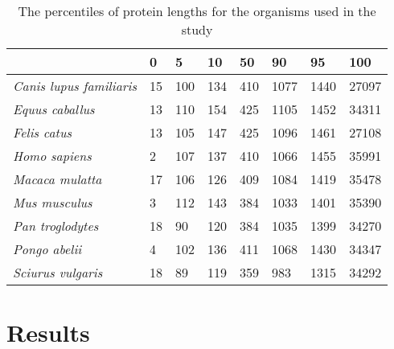 \documentclass[12pt]{article}
\begin{document}
\begin{table}[htbp!]
  \caption{The percentiles of protein lengths for the organisms used
    in the study}
  \label{tab:lengthdist}
  \begin{tabular}{|l|lllllll|}
    
    & 0                        & 5  & 10  & 50  & 90   & 95   & 100
    \\
    \hline
    {\it Canis lupus familiaris} & 15 & 100 & 134 & 410  & 1077 & 1440  & 27097 \\
    {\it Equus caballus}          & 13 & 110 & 154 & 425  & 1105 & 1452  & 34311 \\
    {\it Felis catus}             & 13 & 105 & 147 & 425  & 1096 & 1461  & 27108 \\
    {\it Homo sapiens}            & 2  & 107 & 137 & 410  & 1066 & 1455  & 35991 \\
    {\it Macaca mulatta}          & 17 & 106 & 126 & 409  & 1084 & 1419  & 35478 \\
    {\it Mus musculus}            & 3  & 112 & 143 & 384  & 1033 & 1401  & 35390 \\
    {\it Pan troglodytes} & 18      & 90 & 120 & 384 & 1035 & 1399 & 34270\\
    {\it Pongo abelii}            & 4  & 102 & 136 & 411  & 1068 & 1430  & 34347 \\
    {\it Sciurus vulgaris}        & 18 & 89  & 119 & 359  & 983  & 1315  &
    34292\\
    
  \end{tabular}
\end{table}

\section*{Results}



\end{document}
